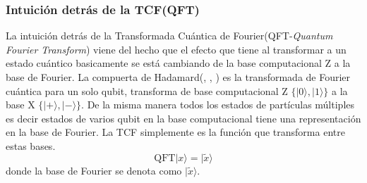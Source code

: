 \documentclass[a4paper]{article}
\begin{document}
\subsubsection{Intuición detrás de la TCF(QFT)}
La intuición detrás de la Transformada Cuántica de Fourier(QFT-\textit{Quantum Fourier Transform}) viene del hecho que el efecto que tiene al transformar a un estado cuántico basicamente se está cambiando de la base computacional Z  a la base de Fourier. La compuerta de Hadamard(\cite{Medina}, \cite{Qiskit}, \cite{Nielsen}) es la transformada de Fourier cuántica para un solo qubit, transforma de base computacional Z $\{|0\rangle, |1\rangle\}$ a la base X $\{|+\rangle, |-\rangle \}$. De la misma manera todos los estados de partículas múltiples es decir estados de varios qubit en la base computacional tiene una representación en la base de Fourier. La TCF simplemente es la función que transforma entre estas bases.
\begin{equation}
\text{QFT}|x\rangle = |\tilde{x}\rangle
\end{equation}
donde la base de Fourier se denota como $|\tilde{x}\rangle$.
\end{document}
